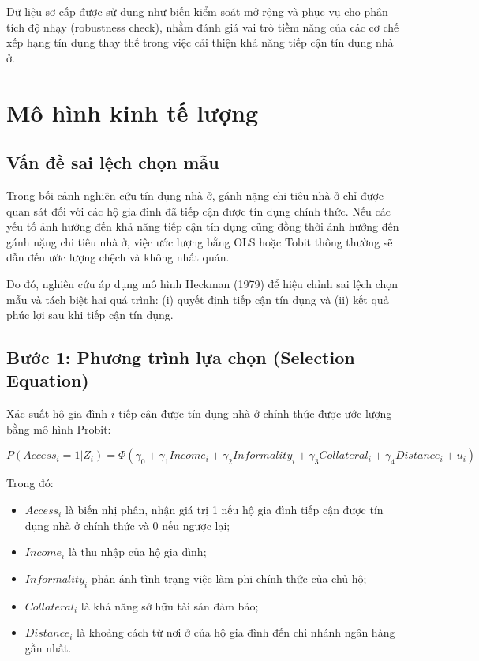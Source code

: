 \documentclass[12pt,a4paper]{report}
\begin{document}
	
	Dữ liệu sơ cấp được sử dụng như biến kiểm soát mở rộng và phục vụ cho phân tích độ nhạy (robustness check), nhằm đánh giá vai trò tiềm năng của các cơ chế xếp hạng tín dụng thay thế trong việc cải thiện khả năng tiếp cận tín dụng nhà ở.
	
	\section{Mô hình kinh tế lượng}
	
	\subsection{Vấn đề sai lệch chọn mẫu}
	
	Trong bối cảnh nghiên cứu tín dụng nhà ở, gánh nặng chi tiêu nhà ở chỉ được quan sát đối với các hộ gia đình đã tiếp cận được tín dụng chính thức. Nếu các yếu tố ảnh hưởng đến khả năng tiếp cận tín dụng cũng đồng thời ảnh hưởng đến gánh nặng chi tiêu nhà ở, việc ước lượng bằng OLS hoặc Tobit thông thường sẽ dẫn đến ước lượng chệch và không nhất quán.
	
	Do đó, nghiên cứu áp dụng mô hình Heckman (1979) để hiệu chỉnh sai lệch chọn mẫu và tách biệt hai quá trình: (i) quyết định tiếp cận tín dụng và (ii) kết quả phúc lợi sau khi tiếp cận tín dụng.
	
	\subsection{Bước 1: Phương trình lựa chọn (Selection Equation)}
	
	Xác suất hộ gia đình $i$ tiếp cận được tín dụng nhà ở chính thức được ước lượng bằng mô hình Probit:
	
	\begin{equation}
		P(Access_i = 1 | Z_i) = \Phi(\gamma_0 + \gamma_1 Income_i + \gamma_2 Informality_i + \gamma_3 Collateral_i + \gamma_4 Distance_i + u_i)
	\end{equation}
	
	Trong đó:
	\begin{itemize}
		\item $Access_i$ là biến nhị phân, nhận giá trị 1 nếu hộ gia đình tiếp cận được tín dụng nhà ở chính thức và 0 nếu ngược lại;
		\item $Income_i$ là thu nhập của hộ gia đình;
		\item $Informality_i$ phản ánh tình trạng việc làm phi chính thức của chủ hộ;
		\item $Collateral_i$ là khả năng sở hữu tài sản đảm bảo;
		\item $Distance_i$ là khoảng cách từ nơi ở của hộ gia đình đến chi nhánh ngân hàng gần nhất.
	\end{itemize}
	
\end{document}
